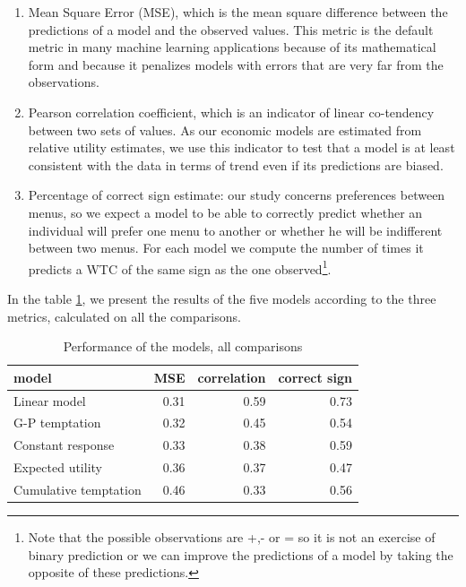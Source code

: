 \documentclass[
]{book}
\providecommand{\tightlist}{%
  \setlength{\itemsep}{0pt}\setlength{\parskip}{0pt}}
\begin{document}
\begin{enumerate}
\def\labelenumi{\arabic{enumi}.}
\tightlist
\item
  Mean Square Error (MSE), which is the mean square difference between the
  predictions of a model and the observed values.
  This metric is the default metric in many machine learning applications because
  of its mathematical form and because it penalizes models with errors that are
  very far from the observations.
\item
  Pearson correlation coefficient, which is an indicator of linear co-tendency
  between two sets of values.
  As our economic models are estimated from relative utility estimates, we use
  this indicator to test that a model is at least consistent with the data in
  terms of trend even if its predictions are biased.
\item
  Percentage of correct sign estimate: our study concerns preferences between
  menus, so we expect a model to be able to correctly predict whether an
  individual will prefer one menu to another or whether he will be indifferent
  between two menus.
  For each model we compute the number of times it predicts a WTC of the same sign
  as the one observed\footnote{Note that the possible observations are +,- or = so it is not an exercise
    of binary prediction or we can improve the predictions of a model by taking the
    opposite of these predictions.}.
\end{enumerate}

In the table \ref{tab:models-table3}, we present the results of the five models according to
the three metrics, calculated on all the comparisons.

\begin{table}

\caption{\label{tab:models-table3}Performance of the models, all comparisons}
\centering
\begin{tabular}[t]{l|r|r|r}
\hline
model & MSE & correlation & correct sign\\
\hline
Linear model & 0.31 & 0.59 & 0.73\\
\hline
G-P temptation & 0.32 & 0.45 & 0.54\\
\hline
Constant response & 0.33 & 0.38 & 0.59\\
\hline
Expected utility & 0.36 & 0.37 & 0.47\\
\hline
Cumulative temptation & 0.46 & 0.33 & 0.56\\
\hline
\end{tabular}
\end{table}
\end{document}

